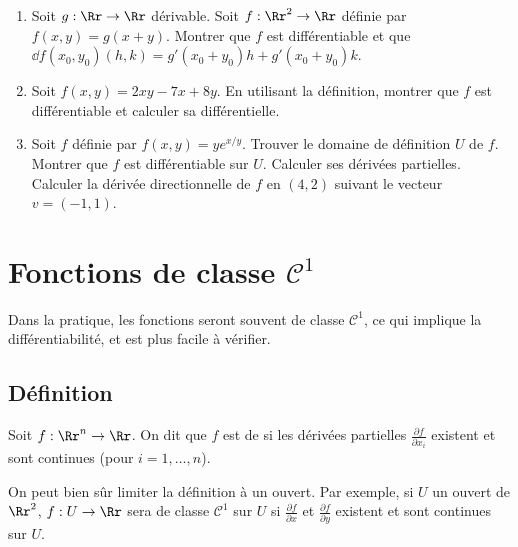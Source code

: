 \documentclass[11pt, class=report,crop=false]{standalone}
\begin{document}
\begin{miniexercices}
\sauteligne
\begin{enumerate}
  \item Soit $g : \Rr \to \Rr$ dérivable. Soit $f : \Rr^2 \to \Rr$ définie par $f(x,y)= g(x+y)$. Montrer que $f$ est différentiable et que
  $\dd f (x_0,y_0)(h,k) = g'(x_0+y_0)h + g'(x_0+y_0)k$.
  
  \item Soit $f(x,y) = 2xy-7x+8y$. En utilisant la définition, montrer que $f$ est différentiable et calculer sa différentielle.
  
  \item Soit $f$ définie par $f(x,y) = ye^{x/y}$. Trouver le domaine de définition $U$ de $f$. Montrer que $f$ est différentiable sur $U$. Calculer ses dérivées partielles. Calculer la dérivée directionnelle de $f$ en $(4,2)$ suivant le vecteur $v = (-1,1)$.
  
\end{enumerate}
\end{miniexercices}





\section{Fonctions de classe $\mathcal{C}^1$}

Dans la pratique, les fonctions seront souvent de classe $\mathcal{C}^1$, ce qui implique la différentiabilité, et est plus facile à vérifier. 


\subsection{Définition}

\begin{definition}
Soit $f: \Rr^n \to \Rr$. On dit que $f$ est de  si les dérivées partielles $\frac{\partial f}{\partial x_i}$
existent et sont continues (pour $i=1,\ldots,n$).
\end{definition}

On peut bien sûr limiter la définition à un ouvert. Par exemple, si $U$ un ouvert de $\Rr^2$, $f : U \to \Rr$ sera de classe $\mathcal{C}^1$ sur $U$ si $\frac{\partial f}{\partial x}$ et $\frac{\partial f}{\partial y}$ existent et sont continues sur $U$.
\end{document}
